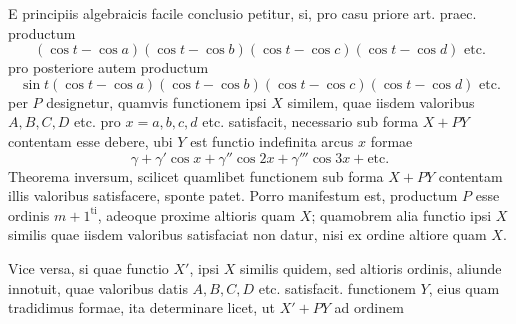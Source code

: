 E principiis algebraicis facile conclusio petitur, si, pro casu priore art. praec.
productum
\[
(\cos t-\cos a)(\cos t-\cos b)(\cos t-\cos c)(\cos t-\cos d)\text{ etc.}
\]
pro posteriore autem productum
\[
\sin t(\cos t-\cos a)(\cos t-\cos b)(\cos t-\cos c)(\cos t-\cos d)\text{ etc.}
\]
per \(P\) designetur, quamvis functionem ipsi \(X\) similem, quae iisdem valoribus
\(A,B,C,D\) etc. pro \(x=a,b,c,d\) etc. satisfacit, necessario sub forma \(X+PY\)
contentam esse debere, ubi \(Y\) est functio indefinita arcus \(x\) formae
\[
\gamma+\gamma'\cos x+\gamma''\cos 2x+\gamma'''\cos 3x+\text{etc.}
\]
Theorema inversum, scilicet quamlibet functionem sub forma \(X+PY\) contentam illis valoribus satisfacere, sponte patet. Porro manifestum est, productum
\(P\) esse ordinis \(m+1^{\mathrm{ti}}\), adeoque proxime altioris quam \(X\); quamobrem alia functio
ipsi \(X\) similis quae iisdem valoribus satisfaciat non datur, nisi ex ordine altiore
quam \(X\).

Vice versa, si quae functio \(X'\), ipsi \(X\) similis quidem, sed altioris ordinis,
aliunde innotuit, quae valoribus datis \(A,B,C,D\) etc. satisfacit. functionem \(Y\),
eius quam tradidimus formae, ita determinare licet, ut \(X'+PY\) ad ordinem
\endgroup
